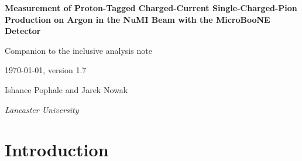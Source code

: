 \documentclass[11pt,a4paper]{article}
\newcommand{\uboone}{MicroBooNE}
\newcommand{\GeVc}{\,\text{GeV}\!/c}
\begin{document}
\begin{titlepage}
  \centering
  \vspace*{2cm}
  {\LARGE\bfseries Measurement of Proton-Tagged Charged-Current Single-Charged-Pion Production on
    Argon in the NuMI Beam with the \uboone{} Detector\par}
  \vspace{0.8cm}
  {\large Companion to the inclusive analysis note\par}
  \vspace{0.5cm}
  \vspace{0.5cm}
\today, {\large version 1.7}

  \vspace{1.5cm}
  {\large Ishanee Pophale and Jarek Nowak\par}
  \vspace{0.5cm}
  {\normalsize\itshape Lancaster University\par}
  \vspace{2cm}
  \begin{abstract}
    The inclusive CC$\pi^{\pm}$ measurement of the companion note is repeated on the subsample in which
    a proton candidate with $p_p>0.3\GeVc$ is also reconstructed. All results are extracted from
    pseudo-data. The proton gives access to the
    visible hadronic system: the proton momentum and direction, the pion--proton opening angle, a
    calorimetric hadronic-mass proxy and the transverse kinematic imbalance between the muon and the
    $\pi p$ system. The cross sections are averaged over the $\nu_\mu+\bar\nu_\mu$ flux integrated above
    $60$~MeV and extracted in the FHC, RHC and combined configurations with the Wiener-SVD machinery of
    the inclusive analysis, each with its additional-smearing matrix and covariance. The one-bin total
    cross section, $d\sigma/d\theta_p$ and $d\sigma/d\theta_{\pi p}$, and the combined-configuration
    $d^2\sigma/d\theta_p\,d\delta p_T$ are also obtained. The one-bin total carries a $42$--$47\%$
    uncertainty; ensembles of pseudo-experiments give pull widths of $0.94$--$1.08$.
  \end{abstract}
  \vfill
  \tableofcontents
\end{titlepage}

\section{Introduction}
\label{sec:pt_intro}
\end{document}
